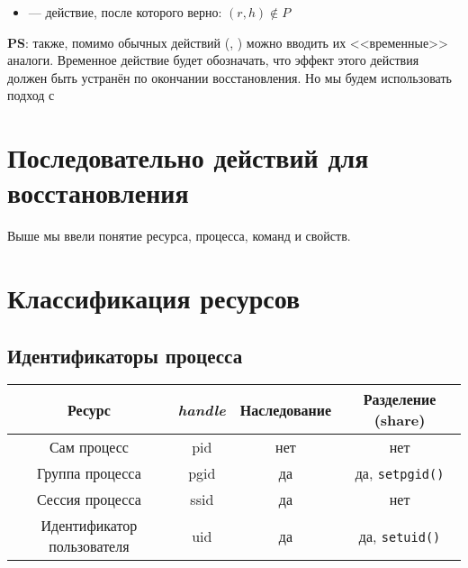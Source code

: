 \begin{itemize}
	\item {} --- действие, после которого верно: $(r, h) \notin P$
\end{itemize}

\textbf{PS}: также, помимо обычных действий (, ) можно вводить их <<временные>> аналоги. Временное действие будет обозначать, что эффект этого действия должен быть устранён по окончании восстановления. Но мы будем использовать подход с 

\section{Последовательно действий для восстановления}

Выше мы ввели понятие ресурса, процесса, команд и свойств.

\section{Классификация ресурсов}

\subsection{Идентификаторы процесса}

\begin{table}[ht!]
\centering
\begin{tabular}{|c|c|c|c|}
	\hline
	\textbf{Ресурс} & \textit{\textbf{handle}} & \textbf{Наследование} & \textbf{Разделение (share)} \\
	\hline
	\hline
	Сам процесс & pid & нет & нет \\
	\hline
	Группа процесса & pgid & да & да, \texttt{setpgid()} \\
	\hline
	Сессия процесса & ssid & да & нет \\
	\hline
	Идентификатор пользователя & uid & да & да, \texttt{setuid()} \\
	\hline
\end{tabular}
\end{table}

